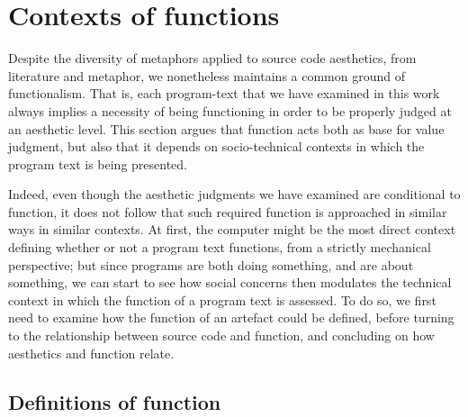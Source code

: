 \section{Contexts of functions} %
\label{sec:contexts-of-functions}



Despite the diversity of metaphors applied to source code aesthetics, from literature and metaphor, we nonetheless maintains a common ground of functionalism. That is, each program-text that we have examined in this work always implies a necessity of being functioning in order to be properly judged at an aesthetic level. This section argues that function acts both as base for value judgment, but also that it depends on socio-technical contexts in which the program text is being presented.

Indeed, even though the aesthetic judgments we have examined are conditional to function, it does not follow that such required function is approached in similar ways in similar contexts. At first, the computer might be the most direct context defining whether or not a program text functions, from a strictly mechanical perspective; but since programs are both doing something, and are about something, we can start to see how social concerns then modulates the technical context in which the function of a program text is assessed. To do so, we first need to examine how the function of an artefact could be defined, before turning to the relationship between source code and function, and concluding on how aesthetics and function relate.

\subsection{Definitions of function}
\label{subsec:definitions-function}

